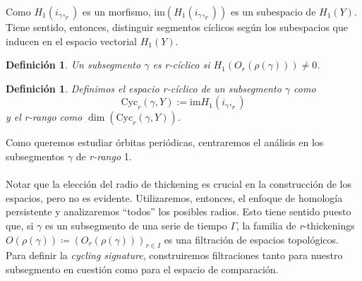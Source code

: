 \documentclass[12pt,a4paper]{article}
\newtheorem{definition}[theorem]{Definición}
\begin{document}
Como $H_1(i_\gamma,_r)$ es un morfismo, $\text{im}(H_1(i_\gamma,_r))$ es un subespacio de $H_1(Y)$. Tiene sentido, entonces, distinguir segmentos cíclicos según los subespacios que inducen en el espacio vectorial $H_1(Y)$.
\begin{definition}
    Un subsegmento $\gamma$ es \textit{r-cíclico} si $H_1({O_r}(\rho(\gamma))) \neq 0$.
\end{definition}
\begin{definition}
    Definimos el espacio r-cíclico de un subsegmento $\gamma$ como
    \[
        \text{Cyc}_r(\gamma,Y) := \text{im}H_1(i_\gamma,_r)
    \]
    y el \textit{r-rango} como $\dim (\text{Cyc}_r(\gamma,Y))$.
\end{definition}
Como queremos estudiar órbitas periódicas, centraremos el análisis en los subsegmentos $\gamma$ de \textit{r-rango} 1.
\\
\\
Notar que la elección del radio de thickening es crucial en la construcción de los espacios, pero no es evidente. Utilizaremos, entonces, el enfoque de homología persistente y analizaremos ``todos'' los posibles radios. Esto tiene sentido puesto que, si $\gamma$ es un subsegmento de una serie de tiempo $\Gamma$, la familia de \textit{r}-thickenings $O(\rho(\gamma)) \coloneqq (O_r(\rho(\gamma)))_{r \in I}$ es una filtración de espacios topológicos. Para definir la \textit{cycling signature}, construiremos filtraciones tanto para nuestro subsegmento en cuestión como para el espacio de comparación.
\\
\end{document}
